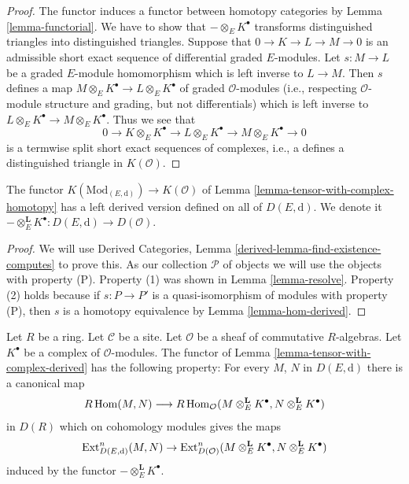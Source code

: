 \begin{proof}
The functor induces a functor between homotopy categories by
Lemma \ref{lemma-functorial}.
We have to show that $- \otimes_E K^\bullet$ transforms distinguished
triangles into distinguished triangles.
Suppose that $0 \to K \to L \to M \to 0$ is an admissible short
exact sequence of differential graded $E$-modules. Let $s : M \to L$ be
a graded $E$-module homomorphism which is left inverse to $L \to M$.
Then $s$ defines a map $M \otimes_E K^\bullet \to L \otimes_E K^\bullet$
of graded $\mathcal{O}$-modules (i.e., respecting $\mathcal{O}$-module
structure and grading, but not differentials)
which is left inverse to $L \otimes_E K^\bullet \to M \otimes_E K^\bullet$.
Thus we see that
$$
0 \to K \otimes_E K^\bullet \to L \otimes_E K^\bullet \to
M \otimes_E K^\bullet \to 0
$$
is a termwise split short exact sequences of complexes, i.e., a
defines a distinguished triangle in $K(\mathcal{O})$.
\end{proof}

\begin{lemma}
\label{lemma-tensor-with-complex-derived}
The functor $K(\text{Mod}_{(E, \text{d})}) \to K(\mathcal{O})$
of Lemma \ref{lemma-tensor-with-complex-homotopy} has a left derived
version defined on all of $D(E, \text{d})$. We denote it
$- \otimes_E^\mathbf{L} K^\bullet : D(E, \text{d}) \to D(\mathcal{O})$.
\end{lemma}

\begin{proof}
We will use
Derived Categories, Lemma \ref{derived-lemma-find-existence-computes}
to prove this. As our collection $\mathcal{P}$
of objects we will use the objects with property (P).
Property (1) was shown in Lemma \ref{lemma-resolve}.
Property (2) holds because if $s : P \to P'$ is a quasi-isomorphism
of modules with property (P), then $s$ is a homotopy equivalence
by Lemma \ref{lemma-hom-derived}.
\end{proof}

\begin{lemma}
\label{lemma-upgrade-tensor-with-complex-derived}
Let $R$ be a ring. Let $\mathcal{C}$ be a site. Let $\mathcal{O}$
be a sheaf of commutative $R$-algebras. Let $K^\bullet$
be a complex of $\mathcal{O}$-modules.
The functor
of Lemma \ref{lemma-tensor-with-complex-derived} has the following
property: For every $M$, $N$ in $D(E, \text{d})$ there is a
canonical map
$$
R\mathop{\mathrm{Hom}}\nolimits(M, N)
\longrightarrow
R\mathop{\mathrm{Hom}}\nolimits_\mathcal{O}(M \otimes_E^\mathbf{L} K^\bullet,
N \otimes_E^\mathbf{L} K^\bullet)
$$
in $D(R)$ which on cohomology modules gives the maps
$$
\mathop{\mathrm{Ext}}\nolimits^n_{D(E, \text{d})}(M, N) \to
\mathop{\mathrm{Ext}}\nolimits^n_{D(\mathcal{O})}
(M \otimes_E^\mathbf{L} K^\bullet, N \otimes_E^\mathbf{L} K^\bullet)
$$
induced by the functor $- \otimes_E^\mathbf{L} K^\bullet$.
\end{lemma}

